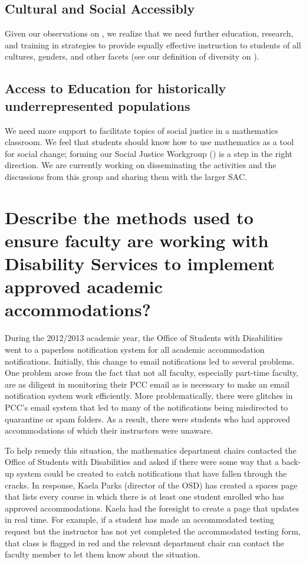 \subsection{Cultural and Social Accessibly}
Given our observations on , we realize that we need
further education, research, and training in strategies to provide equally
effective instruction to students of all cultures, genders, and other facets
(see our definition of diversity on ).

\subsection{Access to Education for historically underrepresented populations}
We need more support to facilitate topics of social justice in a mathematics classroom. We
feel that students should know how to use mathematics as a tool for social
change; forming our Social Justice Workgroup () is 
a step in the right direction. We are currently working on disseminating the activities and the discussions from this
group and sharing them with the larger SAC.

\section{Describe the methods used to ensure faculty are working with Disability Services to implement approved academic accommodations?}
During the 2012/2013 academic year, the Office of Students with Disabilities
went to a paperless notification system for all academic accommodation
notifications.  Initially, this change to email notifications led to several
problems.  One problem arose from the fact that not all faculty, especially
part-time faculty, are as diligent in monitoring their PCC email as is
necessary to make an email notification system work efficiently.  More
problematically, there were glitches in PCC's email system that led to many of the
notifications being misdirected to quarantine or spam folders.  As a result,
there were students who had approved accommodations of which their instructors
were unaware.

To help remedy this situation, the mathematics department chairs contacted the
Office of Students with Disabilities and asked if there were some way that a
back-up system could be created to catch notifications that have fallen through
the cracks.  In response, Kaela Parks (director of the OSD) has created a
spaces page that lists every course in which there is at least one student
enrolled who has approved accommodations.  Kaela had the foresight to create a
page that updates in real time.  For example, if a student has made an
accommodated testing request but the instructor has not yet completed the
accommodated testing form, that class is flagged in red and the relevant
department chair can contact the faculty member to let them know about the
situation.

